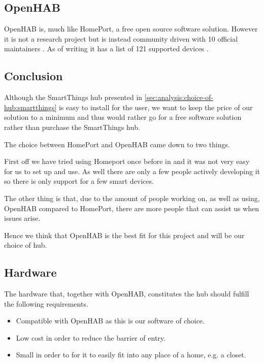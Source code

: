 \subsection{OpenHAB}
\label{sec:analysis:choice-of-hub:openhab}

OpenHAB \cite{OPENHAB} is, much like HomePort, a free open source software solution.
However it is not a research project but is instead community driven with 10 official maintainers \cite{openhab:maintainers}.
As of writing it has a list of 121 supported devices \cite{openhab:supported-technologies}.

\subsection{Conclusion}
\label{sec:analysis:choice-of-hub:conclusion}

Although the SmartThings hub presented in \cref{sec:analysis:choice-of-hub:smartthings} is easy to install for the user, we want to keep the price of our solution to a minimum and thus would rather go for a free software solution rather than purchase the SmartThings hub.

The choice between HomePort and OpenHAB came down to two things.

First off we have tried using Homeport once before in \cite{previous-report} and it was not very easy for us to set up and use.
As well there are only a few people actively developing it so there is only support for a few smart devices.

The other thing is that, due to the amount of people working on, as well as using, OpenHAB compared to HomePort, there are more people that can assist us when issues arise.

Hence we think that OpenHAB is the best fit for this project and will be our choice of hub.

\subsection{Hardware}

The hardware that, together with OpenHAB, constitutes the hub should fulfill the following requirements.

\begin{itemize}
\item Compatible with OpenHAB as this is our software of choice.
\item Low cost in order to reduce the barrier of entry.
\item Small in order to for it to easily fit into any place of a home, e.g. a closet.
\end{itemize}

